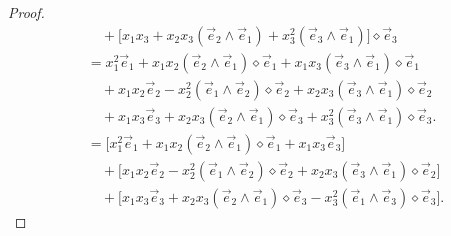 \documentclass[10pt,a4paper]{amsart}
\begin{document}
\begin{proof}
\begin{align*}
&\quad + \Big[
x_{1}x_{3}
+ x_{2}x_{3}\left( \vec{e}_{2}\wedge \vec{e}_{1} \right)
+ x_{3}^{2}\left( \vec{e}_{3}\wedge \vec{e}_{1} \right)
\Big]\diamond \vec{e}_{3} \\[4pt]
&= x_{1}^{2}\vec{e}_{1}
+ x_{1}x_{2}\left( \vec{e}_{2}\wedge \vec{e}_{1} \right)\diamond \vec{e}_{1}
+ x_{1}x_{3}\left( \vec{e}_{3}\wedge \vec{e}_{1} \right)\diamond \vec{e}_{1} \\[6pt]
&\quad + x_{1}x_{2}\vec{e}_{2}
- x_{2}^{2}\left( \vec{e}_{1}\wedge \vec{e}_{2} \right)\diamond \vec{e}_{2}
+ x_{2}x_{3}\left( \vec{e}_{3}\wedge \vec{e}_{1} \right)\diamond \vec{e}_{2} \\[6pt]
&\quad + x_{1}x_{3}\vec{e}_{3}
+ x_{2}x_{3}\left( \vec{e}_{2}\wedge \vec{e}_{1} \right)\diamond \vec{e}_{3}
+ x_{3}^{2}\left( \vec{e}_{3}\wedge \vec{e}_{1} \right)\diamond \vec{e}_{3}. \\[4pt]
&= \Big[
x_{1}^{2}\vec{e}_{1}
+ x_{1}x_{2}\left( \vec{e}_{2}\wedge \vec{e}_{1} \right)\diamond \vec{e}_{1}
+ x_{1}x_{3}\vec{e}_{3}
\Big] \\[6pt]
&\quad + \Big[
x_{1}x_{2}\vec{e}_{2}
- x_{2}^{2}\left( \vec{e}_{1}\wedge \vec{e}_{2} \right)\diamond \vec{e}_{2}
+ x_{2}x_{3}\left( \vec{e}_{3}\wedge \vec{e}_{1} \right)\diamond \vec{e}_{2}
\Big] \\[6pt]
&\quad + \Big[
x_{1}x_{3}\vec{e}_{3}
+ x_{2}x_{3}\left( \vec{e}_{2}\wedge \vec{e}_{1} \right)\diamond \vec{e}_{3}
- x_{3}^{2}\left( \vec{e}_{1}\wedge \vec{e}_{3} \right)\diamond \vec{e}_{3}
\Big].
\end{align*}


\end{proof}
\end{document}
